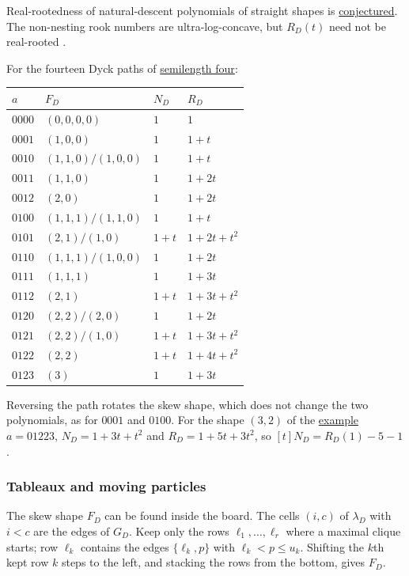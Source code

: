 Real-rootedness of natural-descent polynomials of straight shapes is
\hyperref[conjSYTNaturalDescents]{conjectured}.  The non-nesting rook numbers
are ultra-log-concave, but $R_D(t)$ need not be real-rooted
\cite{AlexanderssonJal2024x}.

\begin{example*}
For the fourteen Dyck paths of
\hyperref[dyckPathSemilengthFour]{semilength four}:

\begin{tabular}{llll}
\toprule
$a$ & $F_D$ & $N_D$ & $R_D$ \\
\midrule
$0000$ & $(0,0,0,0)$ & $1$ & $1$ \\
$0001$ & $(1,0,0)$ & $1$ & $1+t$ \\
$0010$ & $(1,1,0)/(1,0,0)$ & $1$ & $1+t$ \\
$0011$ & $(1,1,0)$ & $1$ & $1+2t$ \\
$0012$ & $(2,0)$ & $1$ & $1+2t$ \\
$0100$ & $(1,1,1)/(1,1,0)$ & $1$ & $1+t$ \\
$0101$ & $(2,1)/(1,0)$ & $1+t$ & $1+2t+t^2$ \\
$0110$ & $(1,1,1)/(1,0,0)$ & $1$ & $1+2t$ \\
$0111$ & $(1,1,1)$ & $1$ & $1+3t$ \\
$0112$ & $(2,1)$ & $1+t$ & $1+3t+t^2$ \\
$0120$ & $(2,2)/(2,0)$ & $1$ & $1+2t$ \\
$0121$ & $(2,2)/(1,0)$ & $1+t$ & $1+3t+t^2$ \\
$0122$ & $(2,2)$ & $1+t$ & $1+4t+t^2$ \\
$0123$ & $(3)$ & $1$ & $1+3t$ \\
\bottomrule
\end{tabular}

Reversing the path rotates the skew shape, which does not change the two
polynomials, as for $0001$ and $0100$.  For the shape $(3,2)$ of the
\hyperref[dyckPathRunningExample]{example} $a=01223$,
$N_D=1+3t+t^2$ and $R_D=1+5t+3t^2$, so $[t]N_D=R_D(1)-5-1$.
\end{example*}


\subsubsection[dyckPathParticles]{Tableaux and moving particles}

The skew shape $F_D$ can be found inside the board.  The cells $(i,c)$ of
$\lambda_D$ with $i<c$ are the edges of $G_D$.  Keep only the rows
$\ell_1,\dotsc,\ell_r$ where a maximal clique starts; row $\ell_k$ contains the
edges $\{\ell_k,p\}$ with $\ell_k<p\leq u_k$.  Shifting the $k$th kept row
$k$ steps to the left, and stacking the rows from the bottom, gives $F_D$.


